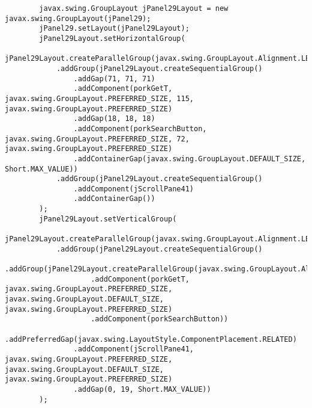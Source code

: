 \documentclass[12pt,a4paper]{article}
\begin{document}
\begin{lstlisting}
        javax.swing.GroupLayout jPanel29Layout = new javax.swing.GroupLayout(jPanel29);
        jPanel29.setLayout(jPanel29Layout);
        jPanel29Layout.setHorizontalGroup(
            jPanel29Layout.createParallelGroup(javax.swing.GroupLayout.Alignment.LEADING)
            .addGroup(jPanel29Layout.createSequentialGroup()
                .addGap(71, 71, 71)
                .addComponent(porkGetT, javax.swing.GroupLayout.PREFERRED_SIZE, 115, javax.swing.GroupLayout.PREFERRED_SIZE)
                .addGap(18, 18, 18)
                .addComponent(porkSearchButton, javax.swing.GroupLayout.PREFERRED_SIZE, 72, javax.swing.GroupLayout.PREFERRED_SIZE)
                .addContainerGap(javax.swing.GroupLayout.DEFAULT_SIZE, Short.MAX_VALUE))
            .addGroup(jPanel29Layout.createSequentialGroup()
                .addComponent(jScrollPane41)
                .addContainerGap())
        );
        jPanel29Layout.setVerticalGroup(
            jPanel29Layout.createParallelGroup(javax.swing.GroupLayout.Alignment.LEADING)
            .addGroup(jPanel29Layout.createSequentialGroup()
                .addGroup(jPanel29Layout.createParallelGroup(javax.swing.GroupLayout.Alignment.BASELINE)
                    .addComponent(porkGetT, javax.swing.GroupLayout.PREFERRED_SIZE, javax.swing.GroupLayout.DEFAULT_SIZE, javax.swing.GroupLayout.PREFERRED_SIZE)
                    .addComponent(porkSearchButton))
                .addPreferredGap(javax.swing.LayoutStyle.ComponentPlacement.RELATED)
                .addComponent(jScrollPane41, javax.swing.GroupLayout.PREFERRED_SIZE, javax.swing.GroupLayout.DEFAULT_SIZE, javax.swing.GroupLayout.PREFERRED_SIZE)
                .addGap(0, 19, Short.MAX_VALUE))
        );


\end{lstlisting}
\end{document}
